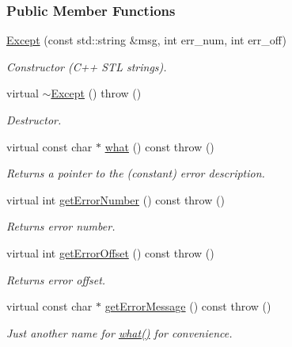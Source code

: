 \subsubsection*{Public Member Functions}
\begin{DoxyCompactItemize}
\item 
\hyperlink{classjpcre2_1_1Except_a302b67f0fbc5f906bac67a4572ff29ec}{Except} (const std\+::string \&msg, int err\+\_\+num, int err\+\_\+off)
\begin{DoxyCompactList}\small\item\em Constructor (C++ S\+TL strings). \end{DoxyCompactList}\item 
virtual \hyperlink{classjpcre2_1_1Except_a569a8058f61bb4e0b7085f18c4bd528c}{$\sim$\+Except} ()  throw ()
\begin{DoxyCompactList}\small\item\em Destructor. \end{DoxyCompactList}\item 
virtual const char $\ast$ \hyperlink{classjpcre2_1_1Except_a25b9f1b3aed24f47eee5c06b859b4adf}{what} () const   throw ()
\begin{DoxyCompactList}\small\item\em Returns a pointer to the (constant) error description. \end{DoxyCompactList}\item 
virtual int \hyperlink{classjpcre2_1_1Except_aaaf8e0495d44a7767bdaaec6e0ad8f86}{get\+Error\+Number} () const   throw ()
\begin{DoxyCompactList}\small\item\em Returns error number. \end{DoxyCompactList}\item 
virtual int \hyperlink{classjpcre2_1_1Except_a1d866b4f80cf0b4103db226e55c9cef8}{get\+Error\+Offset} () const   throw ()
\begin{DoxyCompactList}\small\item\em Returns error offset. \end{DoxyCompactList}\item 
virtual const char $\ast$ \hyperlink{classjpcre2_1_1Except_aa9f557fe16222ac89a30c438212c0c09}{get\+Error\+Message} () const   throw ()
\begin{DoxyCompactList}\small\item\em Just another name for \hyperlink{classjpcre2_1_1Except_a25b9f1b3aed24f47eee5c06b859b4adf}{what()} for convenience. \end{DoxyCompactList}\end{DoxyCompactItemize}
